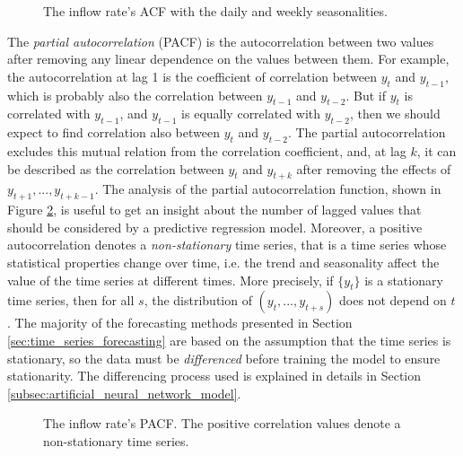 \begin{figure}
  \begin{center}
  \end{center}
  \caption{The inflow rate's ACF with the daily and weekly seasonalities.}
  \label{fig:inflow_rate_acf}
\end{figure}

The \emph{partial autocorrelation} (PACF) is the autocorrelation between two values after removing any linear dependence on the values between them. For example, the autocorrelation at lag 1 is the coefficient of correlation between \( y_t \) and \( y_{t-1} \), which is probably also the correlation between \( y_{t-1} \) and \( y_{t-2} \). But if \( y_t \) is correlated with \( y_{t-1} \), and \( y_{t-1} \) is equally correlated with \( y_{t-2} \), then we should expect to find correlation also between \( y_t \) and \( y_{t-2} \). The partial autocorrelation excludes this mutual relation from the correlation coefficient, and, at lag \( k \), it can be described as the correlation between \( y_t \) and \( y_{t+k} \) after removing the effects of \( y_{t+1}, ..., y_{t+k-1} \). The analysis of the partial autocorrelation function, shown in Figure \ref{fig:inflow_rate_pacf}, is useful to get an insight about the number of lagged values that should be considered by a predictive regression model. Moreover, a positive autocorrelation denotes a \emph{non-stationary} time series, that is a time series whose statistical properties change over time, i.e. the trend and seasonality affect the value of the time series at different times. More precisely, if \( \{ y_t \} \) is a stationary time series, then for all \( s \), the distribution of \( ( y_t, ..., y_{t+s}) \) does not depend on \( t \) \cite{hyndman2018}. The majority of the forecasting methods presented in Section \ref{sec:time_series_forecasting} are based on the assumption that the time series is stationary, so the data must be \emph{differenced} before training the model to ensure stationarity. The differencing process used is explained in details in Section \ref{subsec:artificial_neural_network_model}.

\begin{figure}
  \begin{center}
  \end{center}
  \caption{The inflow rate's PACF. The positive correlation values denote a non-stationary time series.}
  \label{fig:inflow_rate_pacf}
\end{figure}

